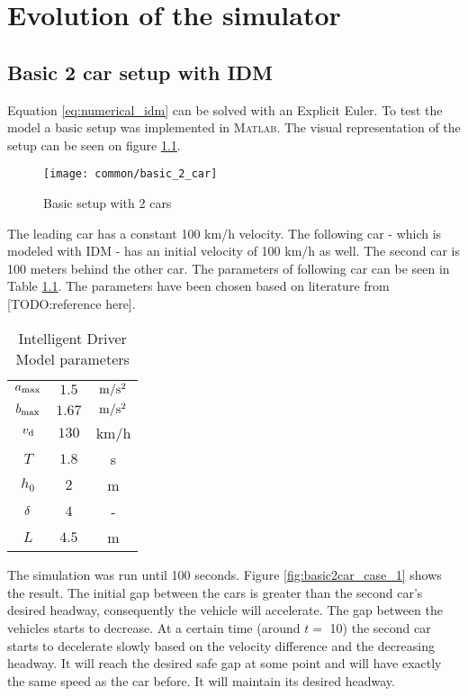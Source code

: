 \chapter{Evolution of the simulator}
	\section{Basic 2 car setup with IDM}\label{sec:base2car}
		Equation \ref{eq:numerical_idm} can be solved with an Explicit Euler. To test the model a basic setup was implemented in \textsc{Matlab}. The visual representation of the setup can be seen on figure \ref{fig:basic2car}.
		\begin{figure}[ht]
			\centering
			\texttt{[image: common/basic\_2\_car]}
			\caption{Basic setup with 2 cars}
			\label{fig:basic2car}
		\end{figure}
		The leading car has a constant 100 km/h velocity. The following car - which is modeled with IDM - has an initial velocity of 100 km/h as well. The second car is 100 meters behind the other car. The parameters of following car can be seen in Table \ref{tab:idm_params}. The parameters have been chosen based on literature from [TODO:reference here].
		\begin{table}[ht]
			\begin{center}
				\begin{tabular}{ |c|c|c| }
					\hline
					$a_{\rm max}$ & $1.5$ & $\rm m/s^2$ \\
					$b_{\rm max}$ & $1.67$ & $\rm m/s^2$ \\
					$v_{\rm d}$ & $130$ & km/h \\
					$T$ & $1.8$ & s \\
					$h_0$ & $2$ & m \\
					$\rm \delta$ & $4$ & - \\
					$L$ & $4.5$ & m \\
					\hline
				\end{tabular}
			\end{center}
			\caption{Intelligent Driver Model parameters}
			\label{tab:idm_params}
		\end{table}
		The simulation was run until 100 seconds. Figure \ref{fig:basic2car_case_1} shows the result. The initial gap between the cars is greater than the second car's desired headway, consequently the vehicle will accelerate. The gap between the vehicles starts to decrease. At a certain time (around $t =$ 10) the second car starts to decelerate slowly based on the velocity difference and the decreasing headway. It will reach the desired safe gap at some point and will have exactly the same speed as the car before. It will maintain its desired headway.
